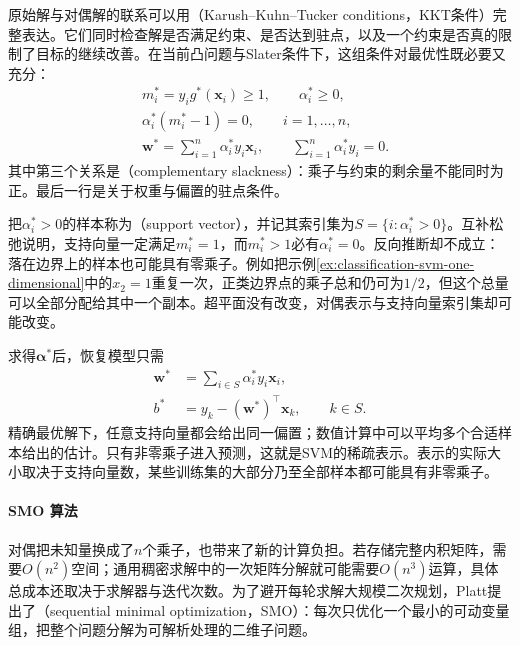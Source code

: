 原始解与对偶解的联系可以用（Karush--Kuhn--Tucker conditions，KKT条件）完整表达。它们同时检查解是否满足约束、是否达到驻点，以及一个约束是否真的限制了目标的继续改善。在当前凸问题与Slater条件下，这组条件对最优性既必要又充分：
\begin{equation}
  \begin{aligned}
    &m_i^{\ast}=y_i g^{\ast}(\bm{x}_i)\ge1,
      \qquad \alpha_i^{\ast}\ge0,\\
    &\alpha_i^{\ast}(m_i^{\ast}-1)=0,
      \qquad i=1,\ldots,n,\\
    &\bm{w}^{\ast}
      =\sum_{i=1}^n\alpha_i^{\ast}y_i\bm{x}_i,
      \qquad \sum_{i=1}^n\alpha_i^{\ast}y_i=0.
  \end{aligned}
  \label{eq:classification-svm-hard-kkt}
\end{equation}
其中第三个关系是（complementary slackness）：乘子与约束的剩余量不能同时为正。最后一行是关于权重与偏置的驻点条件。

把$\alpha_i^{\ast}>0$的样本称为（support vector），并记其索引集为$S=\{i:\alpha_i^{\ast}>0\}$。互补松弛说明，支持向量一定满足$m_i^{\ast}=1$，而$m_i^{\ast}>1$必有$\alpha_i^{\ast}=0$。反向推断却不成立：落在边界上的样本也可能具有零乘子。例如把示例\ref{ex:classification-svm-one-dimensional}中的$x_2=1$重复一次，正类边界点的乘子总和仍可为$1/2$，但这个总量可以全部分配给其中一个副本。超平面没有改变，对偶表示与支持向量索引集却可能改变。

求得$\bm{\alpha}^{\ast}$后，恢复模型只需
\begin{equation}
  \begin{aligned}
    \bm{w}^{\ast}
      &=\sum_{i\in S}\alpha_i^{\ast}y_i\bm{x}_i,\\
    b^{\ast}
      &=y_k-(\bm{w}^{\ast})^{\top}\bm{x}_k,
        \qquad k\in S.
  \end{aligned}
  \label{eq:classification-svm-recover}
\end{equation}
精确最优解下，任意支持向量都会给出同一偏置；数值计算中可以平均多个合适样本给出的估计。只有非零乘子进入预测，这就是SVM的稀疏表示。表示的实际大小取决于支持向量数，某些训练集的大部分乃至全部样本都可能具有非零乘子。

\paragraph{SMO 算法}
\label{sec:classification-svm-smo}

对偶把未知量换成了$n$个乘子，也带来了新的计算负担。若存储完整内积矩阵，需要$O(n^2)$空间；通用稠密求解中的一次矩阵分解就可能需要$O(n^3)$运算，具体总成本还取决于求解器与迭代次数。为了避开每轮求解大规模二次规划，Platt提出了（sequential minimal optimization，SMO）：每次只优化一个最小的可动变量组，把整个问题分解为可解析处理的二维子问题。

